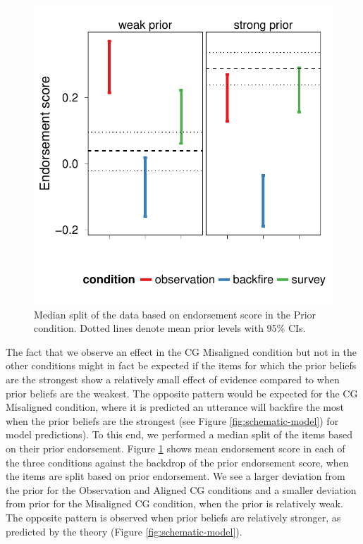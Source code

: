 \documentclass[10pt,letterpaper]{article}
\begin{document}
\begin{figure}
    \includegraphics[width=\columnwidth]{fc2-score-medSplit}
    \caption{Median split of the data based on endorsement score in the Prior condition. 
    Dotted lines denote mean prior levels with 95\% CIs.}
  \label{fig:expt1-medspilt}
\end{figure}

The fact that we observe an effect in the CG Misaligned condition but not in the other conditions might in fact be expected if the items for which the prior beliefs are the strongest show a relatively small effect of evidence compared to when prior beliefs are the weakest.
The opposite pattern would be expected for the CG Misaligned condition, where it is predicted an utterance will backfire the most when the prior beliefs are the strongest (see Figure \ref{fig:schematic-model}) for model predictions).
To this end, we performed a median split of the items based on their prior endorsement. 
Figure \ref{fig:expt1-medspilt} shows mean endorsement score in each of the three conditions against the backdrop of the prior endorsement score, when the items are split based on prior endorsement. 
We see a larger deviation from the prior for the Observation and Aligned CG conditions and a smaller deviation from prior for the Misaligned CG condition, when the prior is relatively weak. 
The opposite pattern is observed when prior beliefs are relatively stronger, as predicted by the theory (Figure \ref{fig:schematic-model}). 
\end{document}
